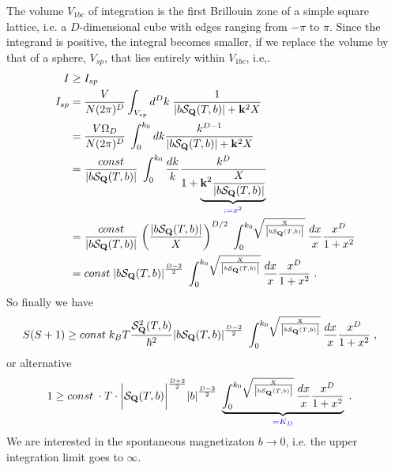 %
The volume $V_{1bc}$ of integration is the first Brillouin zone of a simple square lattice, i.e.
a $D$-dimensional cube with edges ranging from $-\pi$
to $\pi$. Since the integrand is positive, the integral  becomes smaller, if we replace the volume
by that of a sphere, $V_{sp}$, that lies entirely within $V_{1bc}$, i.e,.
%
\begin{align*}
I&\ge I_{sp}\\
I_{sp}&=\frac{V}{N (2\pi)^{D}} \int_{V_{sp}} d^{D}k\;
   \frac{1}{
   \abs{b {\cal S}_{\mathbf Q}(T,b)} +  \mathbf k^{2} X}\\
   &=
    \frac{V \Omega_{D}}{N (2\pi)^{D}}\;\int_{0}^{k_{0}} dk
   \frac{k^{D-1}}{
   \abs{b {\cal S}_{\mathbf Q}(T,b)} +  \mathbf k^{2} X}\\
   &=
    \frac{const}{\abs{b {\cal S}_{\mathbf Q}(T,b)}} \;\int_{0}^{k_{0}} \frac{dk}{k}
   \frac{k^{D}}{
1 +  \underbrace{
\mathbf k^{2}\frac{X}{   \abs{b {\cal S}_{\mathbf Q}(T,b)}}
}_{\color{blue} := x^{2}}}\\
   &=
    \frac{const}{\abs{b {\cal S}_{\mathbf Q}(T,b)}} \;
\bigg(    \frac{   \abs{b {\cal S}_{\mathbf Q}(T,b)}}{X}\bigg)^{D/2}
    \;\int_{0}^{k_{0}\sqrt{\frac{X }{   \abs{b {\cal S}_{\mathbf Q}(T,b)}}} }\frac{dx}{x}
   \frac{x^{D}}{
1 +  x^{2}}\\
   &=
const \;
  \abs{b {\cal S}_{\mathbf Q}(T,b)}^{\frac{D-2}{2}}
    \;\int_{0}^{k_{0}\sqrt{\frac{X }{   \abs{b {\cal S}_{\mathbf Q}(T,b)}}} }
\frac{dx}{x}
   \frac{x^{D}}{
1 +  x^{2}}\;.
\end{align*}
%
So finally we have
%
\begin{align*}
S(S+1) 
   &\ge const \; k_{B}T
\frac{{\cal S}^{2}_{\mathbf Q}(T,b)}{\hbar^{2}}
  \abs{b {\cal S}_{\mathbf Q}(T,b)}^{\frac{D-2}{2}}
    \;\int_{0}^    {k_{0}\sqrt{\frac{X }{   \abs{b {\cal S}_{\mathbf Q}(T,b)}}} }
\frac{dx}{x}
   \frac{x^{D}}{1 +  x^{2}}\;,
\end{align*}
%
or alternative
\begin{align}\label{eq:ineq}
1  &\ge const \;\cdot  T\cdot 
\bigg|{\cal S}_{\mathbf Q}(T,b)\bigg|^{\frac{D+2}{2}}
  \abs{b}^{\frac{D-2}{2}}
    \;\underbrace{
\int_{0}^{k_{0}\sqrt{\frac{X }{   \abs{b {\cal S}_{\mathbf Q}(T,b)}}} }\frac{dx}{x}
   \frac{x^{D}}{
1 +  x^{2}}
}_{\color{blue} = K_{D}}\;.
\end{align}
%
We are interested in the spontaneous magnetizaton $b\to 0$, i.e. the upper integration limit goes to $\infty$.

